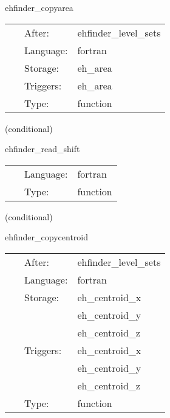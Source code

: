 \hspace{5mm} ehfinder\_copyarea 

\hspace{5mm}{\it copy areas to output variable } 


\hspace{5mm}

 \begin{tabular*}{160mm}{cll} 
~ & After:  & ehfinder\_level\_sets \\ 
~ & Language:  & fortran \\ 
~ & Storage:  & eh\_area \\ 
~ & Triggers:  & eh\_area \\ 
~ & Type:  & function \\ 
\end{tabular*} 


\vspace{5mm}

   (conditional) 

\hspace{5mm} ehfinder\_read\_shift 

\hspace{5mm}{\it read in shift from file } 


\hspace{5mm}

 \begin{tabular*}{160mm}{cll} 
~ & Language:  & fortran \\ 
~ & Type:  & function \\ 
\end{tabular*} 


\vspace{5mm}

   (conditional) 

\hspace{5mm} ehfinder\_copycentroid 

\hspace{5mm}{\it copy centroids to output variable } 


\hspace{5mm}

 \begin{tabular*}{160mm}{cll} 
~ & After:  & ehfinder\_level\_sets \\ 
~ & Language:  & fortran \\ 
~ & Storage:  & eh\_centroid\_x \\ 
~& ~ &eh\_centroid\_y\\ 
~& ~ &eh\_centroid\_z\\ 
~ & Triggers:  & eh\_centroid\_x \\ 
~& ~ &eh\_centroid\_y\\ 
~& ~ &eh\_centroid\_z\\ 
~ & Type:  & function \\ 
\end{tabular*} 


